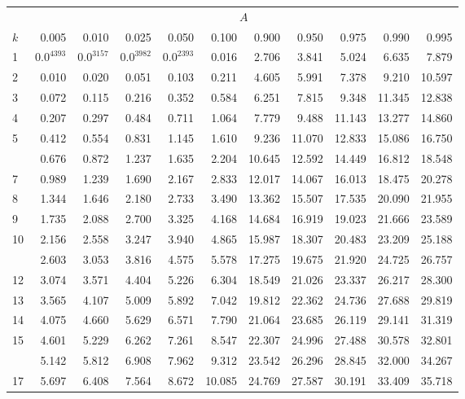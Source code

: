 \documentclass[
]{article}
\begin{document}
\begin{table}[H]
\centering
\begin{tabular}{lrrrrrrrrrr}
\toprule
\multicolumn{1}{c}{ } & \multicolumn{10}{c}{$A$} \\
\cmidrule(l{3pt}r{3pt}){2-11}
$k$ & 0.005 & 0.010 & 0.025 & 0.050 & 0.100 & 0.900 & 0.950 & 0.975 & 0.990 & 0.995\\
\midrule
1 & $0.0^4393$ & $0.0^3157$ & $0.0^3982$ & $0.0^2393$ & 0.016 & 2.706 & 3.841 & 5.024 & 6.635 & 7.879\\
2 & 0.010 & 0.020 & 0.051 & 0.103 & 0.211 & 4.605 & 5.991 & 7.378 & 9.210 & 10.597\\
3 & 0.072 & 0.115 & 0.216 & 0.352 & 0.584 & 6.251 & 7.815 & 9.348 & 11.345 & 12.838\\
4 & 0.207 & 0.297 & 0.484 & 0.711 & 1.064 & 7.779 & 9.488 & 11.143 & 13.277 & 14.860\\
5 & 0.412 & 0.554 & 0.831 & 1.145 & 1.610 & 9.236 & 11.070 & 12.833 & 15.086 & 16.750\\
\addlinespace
6 & 0.676 & 0.872 & 1.237 & 1.635 & 2.204 & 10.645 & 12.592 & 14.449 & 16.812 & 18.548\\
7 & 0.989 & 1.239 & 1.690 & 2.167 & 2.833 & 12.017 & 14.067 & 16.013 & 18.475 & 20.278\\
8 & 1.344 & 1.646 & 2.180 & 2.733 & 3.490 & 13.362 & 15.507 & 17.535 & 20.090 & 21.955\\
9 & 1.735 & 2.088 & 2.700 & 3.325 & 4.168 & 14.684 & 16.919 & 19.023 & 21.666 & 23.589\\
10 & 2.156 & 2.558 & 3.247 & 3.940 & 4.865 & 15.987 & 18.307 & 20.483 & 23.209 & 25.188\\
\addlinespace
11 & 2.603 & 3.053 & 3.816 & 4.575 & 5.578 & 17.275 & 19.675 & 21.920 & 24.725 & 26.757\\
12 & 3.074 & 3.571 & 4.404 & 5.226 & 6.304 & 18.549 & 21.026 & 23.337 & 26.217 & 28.300\\
13 & 3.565 & 4.107 & 5.009 & 5.892 & 7.042 & 19.812 & 22.362 & 24.736 & 27.688 & 29.819\\
14 & 4.075 & 4.660 & 5.629 & 6.571 & 7.790 & 21.064 & 23.685 & 26.119 & 29.141 & 31.319\\
15 & 4.601 & 5.229 & 6.262 & 7.261 & 8.547 & 22.307 & 24.996 & 27.488 & 30.578 & 32.801\\
\addlinespace
16 & 5.142 & 5.812 & 6.908 & 7.962 & 9.312 & 23.542 & 26.296 & 28.845 & 32.000 & 34.267\\
17 & 5.697 & 6.408 & 7.564 & 8.672 & 10.085 & 24.769 & 27.587 & 30.191 & 33.409 & 35.718\\

\end{tabular}
\end{table}
\end{document}
